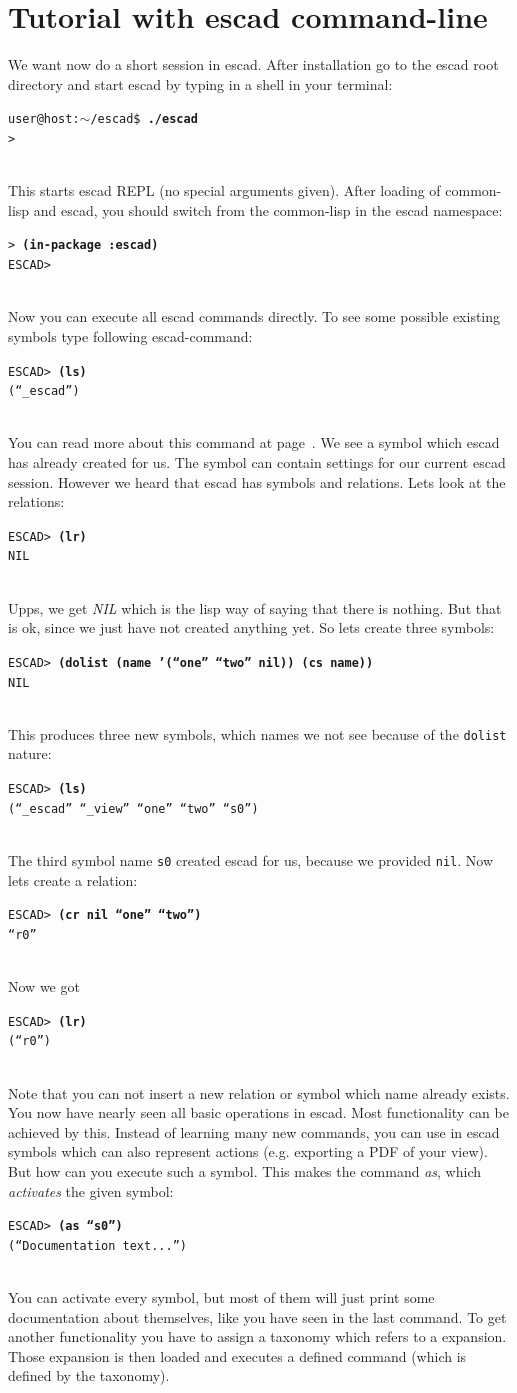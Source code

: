 \documentclass[a4paper, 12pt, openany]{scrbook}
\makeatletter
\newcommand{\shellcmdline}[2]{\\
  \setlength{\fboxsep}{2pt}\colorbox{black!20}{\parbox{\textwidth}{\texttt{user@host:$\sim$/escad\$ \textbf{#1}\\#2}}}\\}
\newcommand{\escadcmdline}[2]{\\\setlength{\fboxsep}{2pt}\colorbox{black!20}{\parbox{\textwidth}{\texttt{ESCAD> \textbf{#1}\\#2}}}\\}
\newcommand{\lispcmdline}[2]{\\\setlength{\fboxsep}{2pt}\colorbox{black!20}{\parbox{\textwidth}{\texttt{> \textbf{#1}\\#2}}}\\}
\makeatother
\begin{document}
\section{Tutorial with escad command-line}
We want now do a short session in escad. After installation go to the escad root directory and start escad by typing in a shell in your terminal:
\shellcmdline{./escad}{>}
This starts escad REPL (no special arguments given). After loading of common-lisp and escad, you should switch from the common-lisp in the escad namespace:
\lispcmdline{(in-package :escad)}{ESCAD>}
Now you can execute all escad commands directly. To see some possible existing symbols type following escad-command:
\escadcmdline{(ls)}{(``\_escad'')}\label{ex:ls}
You can read more about this command at page~\pageref{it:ls}. We see a symbol which escad has already created for us. The symbol can contain settings for our current escad session.
However we heard that escad has symbols and relations. Lets look at the relations:
\escadcmdline{(lr)}{NIL}\label{ex:lr}
Upps, we get \emph{NIL} which is the lisp way of saying that there is nothing. But that is ok, since we just have not created anything yet. So lets create three symbols:
\escadcmdline{(dolist (name '(``one'' ``two'' nil)) (cs name))}{NIL}\label{ex:cs}
This produces three new symbols, which names we not see because of the \texttt{dolist} nature:
\escadcmdline{(ls)}{(``\_escad'' ``\_view'' ``one'' ``two'' ``s0'')}
The third symbol name \texttt{s0} created escad for us, because we provided \texttt{nil}.
Now lets create a relation:
\escadcmdline{(cr nil ``one'' ``two'')}{``r0''}\label{ex:cr}
Now we got
\escadcmdline{(lr)}{(``r0'')}
Note that you can not insert a new relation or symbol which name already exists.
You now have nearly seen all basic operations in escad. Most functionality can be achieved by this. Instead of learning many new commands, you can use in escad symbols which can also represent actions (e.g. exporting a PDF of your view). But how can you execute such a symbol. This makes the command \emph{as}, which \emph{activates} the given symbol:
\escadcmdline{(as ``s0'')}{(``Documentation text...'')}
You can activate every symbol, but most of them will just print some documentation about themselves, like you have seen in the last command. To get another functionality you have to assign a taxonomy which refers to a expansion. Those expansion is then loaded and executes a defined command (which is defined by the taxonomy).
\end{document}
